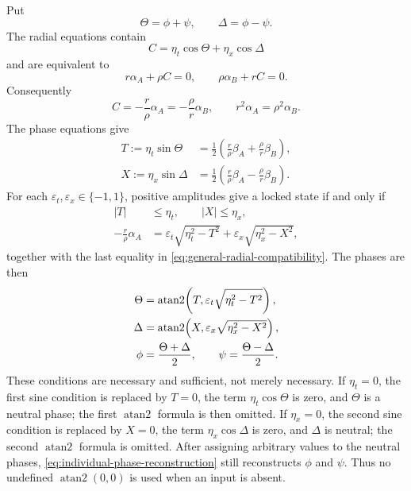 Put
\begin{equation}
 \Theta=\phi+\psi,\qquad \Delta=\phi-\psi.
 \label{eq:phase-sum-difference}
\end{equation}
The radial equations contain
\begin{equation}
 C=\eta_t\cos\Theta+\eta_x\cos\Delta
 \label{eq:phase-C}
\end{equation}
and are equivalent to
\begin{equation}
 r\alpha_A+\rho C=0,\qquad
 \rho\alpha_B+rC=0.
 \label{eq:general-radial-locking}
\end{equation}
Consequently
\begin{equation}
 C=-\frac{r}{\rho}\alpha_A
   =-\frac{\rho}{r}\alpha_B,\qquad
 r^2\alpha_A=\rho^2\alpha_B.
 \label{eq:general-radial-compatibility}
\end{equation}
The phase equations give
\begin{align}
 T:=\eta_t\sin\Theta
 &=\frac12\left(\frac{r}{\rho}\beta_A
                 +\frac{\rho}{r}\beta_B\right),
 \label{eq:phase-T}\\
 X:=\eta_x\sin\Delta
 &=\frac12\left(\frac{r}{\rho}\beta_A
                 -\frac{\rho}{r}\beta_B\right).
 \label{eq:phase-X}
\end{align}
For each $\varepsilon_t,\varepsilon_x\in\{-1,1\}$, positive amplitudes give
a locked state if and only if
\begin{align}
 |T|&\leq\eta_t,\qquad |X|\leq\eta_x,
 \label{eq:phase-sine-bounds}\\
 -\frac{r}{\rho}\alpha_A
 &=\varepsilon_t\sqrt{\eta_t^2-T^2}
  +\varepsilon_x\sqrt{\eta_x^2-X^2},
 \label{eq:general-phase-amplitude-closure}
\end{align}
together with the last equality in
\eqref{eq:general-radial-compatibility}. The phases are then
\begin{align}
 \Theta&=\operatorname{atan2}\!\left(
 T,\varepsilon_t\sqrt{\eta_t^2-T^2}\right),\notag\\
 \Delta&=\operatorname{atan2}\!\left(
 X,\varepsilon_x\sqrt{\eta_x^2-X^2}\right),
 \label{eq:general-phase-reconstruction}\\
 \phi&=\frac{\Theta+\Delta}{2},\qquad
 \psi=\frac{\Theta-\Delta}{2}.
 \label{eq:individual-phase-reconstruction}
\end{align}
These conditions are necessary and sufficient, not merely necessary.
If $\eta_t=0$, the first sine condition is replaced by $T=0$, the term
$\eta_t\cos\Theta$ is zero, and $\Theta$ is a neutral phase; the first
$\operatorname{atan2}$ formula is then omitted.  If $\eta_x=0$, the second
sine condition is replaced by $X=0$, the term $\eta_x\cos\Delta$ is zero,
and $\Delta$ is neutral; the second $\operatorname{atan2}$ formula is
omitted.  After assigning arbitrary values to the neutral phases,
\eqref{eq:individual-phase-reconstruction} still reconstructs $\phi$ and
$\psi$.  Thus no undefined $\operatorname{atan2}(0,0)$ is used when an input
is absent.

